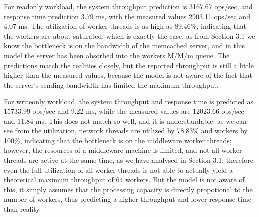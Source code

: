 \begin{table}[!ht]
\caption{\label{tab:qn_1mw}Network of Queues for One Middleware}
\end{table}

For readonly workload, the system throughput prediction is 3167.67 ops/sec, and response time prediction 3.79 ms, with the measured values 2903.11 ops/sec and 4.07 ms. The utilization of worker threads is as high as 89.46\%, indicating that the workers are about saturated, which is exactly the case, as from Section 3.1 we know the bottleneck is on the bandwidth of the memcached server, and in this model the server has been absorbed into the workers M/M/m queue. The predictions match the realities closely, but the reported throughput is still a little higher than the measured values, because the model is not aware of the fact that the server's sending bandwidth has limited the maximum throughput.

For writeonly workload, the system throughput and response time is predicted as 15733.99 ops/sec and 9.22 ms, while the measured values are 12023.66 ops/sec and 11.84 ms. This does not match so well, and it is understandable: as we can see from the utilization, network threads are utilized by 78.83\% and workers by 100\%, indicating that the bottleneck is on the middleware worker threads; however, the resources of a middleware machine is limited, and not all worker threads are active at the same time, as we have analysed in Section 3.1; therefore even the full utilization of all worker threads is not able to actually yield a theoretical maximum throughput of 64 workers. But the model is not aware of this, it simply assumes that the processing capacity is directly propotional to the number of workers, thus predicting a higher throughput and lower response time than reality.

